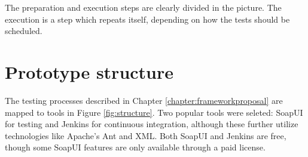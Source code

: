 \documentclass[12pt,a4paper,oneside,pdftex]{report}
\begin{document}
{\begin{comment}
\node [proc] (cap) {Capturing messages};
\node [proc] (gen) {Integration test case/surrogate generation};
\node [proc] (upd) {Updating test package/resources};
\node [syst] (db) {Test data base};
\node [proc] (exe) {Test case execution};
\node [sut] (sut) {System under test};
\node [file, right=of cap] (rec) {Mes-sage record};
\node [file, rihgt=of gen] (cse) {Case/ surrogate};
\node [proc, right=of upd] (ver) {Verification};
\node [file, right=of db] (trc) {Exe-cution trace};
\node [proc, right=of exe] (col) {Trace collecting};

\path [line] (cap) -- (rec);
\path [line] (rec) -- (gen);
\path [line] (gen) -- (cse);
\path [line] (ver) -- (upd); 
\path [line] (cse) -- (2.5,-3) -- (2.5,-8) -- (exe);
\path [dots] (upd) -- (db);
\path [line] (exe) -- (sut);
\path [line] (exe) -- (db);
\path [line] (exe) -- (col);
\path [line] (col) -- (sut);
\path [line] (col) -- (trc);
\path [line] (trc) -- (ver);

\end{tikzpicture}
\caption{Testing framework hypothesis, adapted from \citet{liu2009unified}} \label{fig:UTF}
\end{figure}
\end{comment}

The preparation and execution steps are clearly divided in the picture. The execution is a step which repeats itself, depending on how the tests should be scheduled.



\section{Prototype structure}


The testing processes described in Chapter \ref{chapter:frameworkproposal} are mapped to tools in Figure \ref{fig:structure}. Two popular tools were seleted: SoapUI for testing and Jenkins for continuous integration, although these further utilize technologies like Apache's Ant and XML. Both SoapUI and Jenkins are free, though some SoapUI features are only available through a paid license.

}
\end{document}
